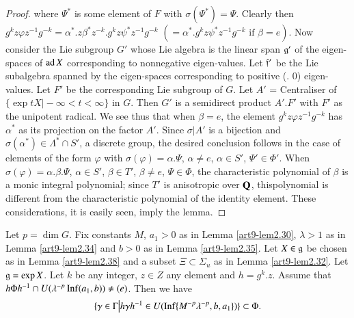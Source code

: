 \begin{proof}
where $\Psi^\ast$ is some element of $F$ with $\sigma (\Psi^\ast) =\Psi$. Clearly then $g^k z \varphi z^{-1} g^{-k} = \alpha^{\ast}. z \beta^{\ast} z^{-k}. g^k z \psi^\ast z^{-1}g^{-k}$ $(= \alpha^{\ast} . g^k z \psi^\ast z^{-1} g^{-k} \text{ if } \beta = e)$. Now consider the Lie subgroup $G'$ whose Lie algebra is the linear span $\mathfrak{g}'$ of the eigen-spaces of $\operatorname{ad} X$ corresponding to nonnegative eigen-values. Let $\mathfrak{f}'$ be the Lie subalgebra spanned by the eigen-spaces corresponding to positive (\resp. 0) eigen-values. Let $F'$ be the corresponding Lie subgroup of $G$. Let $A'$ = Centraliser of $\{\exp t X \big| - \infty < t < \infty\}$ in $G$. Then $G'$ is a semidirect product $A'.F'$ with $F'$ as the unipotent radical. We see thus that when $\beta =e$, the element $g^k z \varphi z^{-1} g^{-k}$ has $\alpha^\ast$ as its projection on the factor $A'$. Since $\sigma|A'$ is a bijection and $\sigma (\alpha^\ast) \in \Lambda^\ast \cap S'$, a discrete group, the desired conclusion follows in the case of elements of the form $\varphi$ with $\sigma (\varphi) = \alpha . \Psi$, $\alpha \neq e$, $\alpha \in S'$, $\Psi' \in \Phi'$. When $\sigma (\varphi)= \alpha. \beta. \Psi$, $\alpha \in S'$, $\beta \in T'$, $\beta \neq e$, $\Psi \in \Phi$, the characteristic polynomial of $\beta$ is a monic integral polynomial; since $T'$ is anisotropic over $\mathbf{Q}$, this\pageoriginale polynomial is different from the characteristic polynomial of the identity element. These considerations, it is easily seen, imply the lemma.
\end{proof}

\setcounter{lemma}{35}
\begin{lemma}\label{art9-lem2.36}
Let  $p = \dim G$. Fix constants $M$, $a_1 >0$ as in Lemma \ref{art9-lem2.30}, $\lambda >1$ as in Lemma \ref{art9-lem2.34} and $b>0$ as in Lemma \ref{art9-lem2.35}. Let $X \in \mathfrak{g}$ be chosen as in Lemma \ref{art9-lem2.38} and a subset $\Xi\subset \Sigma_u$ as in Lemma \ref{art9-lem2.32}. Let $\mathfrak{g} = \exp X$. Let $k$ be any integer, $z \in Z$ any element and $h = g^k.z$. Assume that $h \Phi h^{-1} \cap U (\lambda^{-p} \operatorname{Inf} (a_1, b)) \neq (e)$. Then we have
$$
\{\gamma \in \Gamma \big| h \gamma h^{-1} \in U (\operatorname{Inf} \{M^{-p} \lambda^{-p} , b, a_1\})\} \subset \Phi.
$$
\end{lemma}

